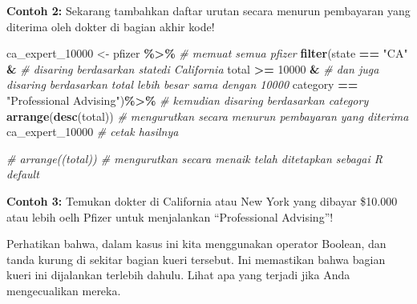 \documentclass[
]{book}
\newenvironment{Shaded}{\begin{snugshade}}{\end{snugshade}}
\newcommand{\CommentTok}[1]{\textcolor[rgb]{0.56,0.35,0.01}{\textit{#1}}}
\newcommand{\DecValTok}[1]{\textcolor[rgb]{0.00,0.00,0.81}{#1}}
\newcommand{\FunctionTok}[1]{\textcolor[rgb]{0.13,0.29,0.53}{\textbf{#1}}}
\newcommand{\NormalTok}[1]{#1}
\newcommand{\OtherTok}[1]{\textcolor[rgb]{0.56,0.35,0.01}{#1}}
\newcommand{\SpecialCharTok}[1]{\textcolor[rgb]{0.81,0.36,0.00}{\textbf{#1}}}
\newcommand{\StringTok}[1]{\textcolor[rgb]{0.31,0.60,0.02}{#1}}
\begin{document}
\textbf{Contoh 2:} Sekarang tambahkan daftar urutan secara menurun pembayaran yang diterima oleh dokter di bagian akhir kode!

\begin{Shaded}
\begin{Highlighting}[]
\NormalTok{ca\_expert\_10000 }\OtherTok{\textless{}{-}}\NormalTok{ pfizer }\SpecialCharTok{\%\textgreater{}\%}                     \CommentTok{\# memuat semua \textasciigrave{}pfizer\textasciigrave{}    }
  \FunctionTok{filter}\NormalTok{(state }\SpecialCharTok{==} \StringTok{"CA"} \SpecialCharTok{\&}                          \CommentTok{\# disaring berdasarkan \textasciigrave{}state\textasciigrave{}di California}
\NormalTok{         total }\SpecialCharTok{\textgreater{}=} \DecValTok{10000} \SpecialCharTok{\&}                         \CommentTok{\# dan juga disaring berdasarkan \textasciigrave{}total\textasciigrave{} lebih besar sama dengan 10000}
\NormalTok{         category }\SpecialCharTok{==} \StringTok{"Professional Advising"}\NormalTok{)}\SpecialCharTok{\%\textgreater{}\%}  \CommentTok{\# kemudian disaring berdasarkan \textasciigrave{}category\textasciigrave{}}
  \FunctionTok{arrange}\NormalTok{(}\FunctionTok{desc}\NormalTok{(total))                            }\CommentTok{\# mengurutkan secara menurun pembayaran yang diterima}
\NormalTok{ca\_expert\_10000                                   }\CommentTok{\# cetak hasilnya}

\CommentTok{\# arrange((total))                                \# mengurutkan secara menaik telah ditetapkan sebagai R default}
\end{Highlighting}
\end{Shaded}

\textbf{Contoh 3:} Temukan dokter di California atau New York yang dibayar \$10.000 atau lebih oelh Pfizer untuk menjalankan ``Professional Advising''!

Perhatikan bahwa, dalam kasus ini kita menggunakan \texttt{\textbar{}} operator Boolean, dan tanda kurung di sekitar bagian kueri tersebut. Ini memastikan bahwa bagian kueri ini dijalankan terlebih dahulu. Lihat apa yang terjadi jika Anda mengecualikan mereka.
\end{document}
